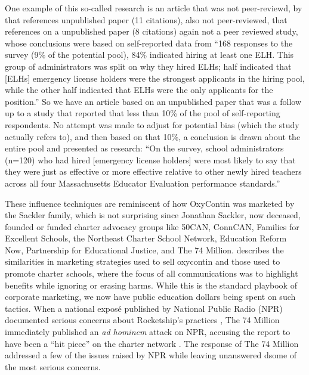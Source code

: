 One example of this so-called research is an article that was not peer-reviewd,  by \citeauthor{Piper-Vallillo2023} that references unpublished paper \textcite{Bacher-Hicks.etal2023} (11 citations), also not peer-reviewed, that references  on a unpublished paper \textcite{Bacher-Hicks.etal2023a} (8 citations) again not a peer reviewed study, whose conclusions were based on self-reported data from ``168 responses to the survey (9\% of the potential pool), 84\% indicated hiring at least one ELH. This group of administrators was split on why they hired ELHs; half indicated that [ELHs] emergency license holders were the strongest applicants in the hiring pool, while the other half indicated that ELHs were the only applicants for the position.'' \parencite[3]{Bacher-Hicks.etal2023} So we have an article based on an unpublished paper that was a follow up to a study that reported that less than 10\% of the pool of self-reporting respondents. No attempt was made to adjust for potential bias (which the study actually refers to), and then based on that 10\%, a conclusion is drawn about the entire pool and presented as research: ``On the survey, school administrators (n=120) who had hired [emergency license holders] were most likely to say that they were just as effective or more effective relative to other newly hired teachers across all four Massachusetts Educator Evaluation performance standards.'' \parencite[3]{Bacher-Hicks.etal2023}

These influence techniques are reminiscent of how OxyContin was marketed by the Sackler family, which is not surprising since Jonathan Sackler, now deceased, founded or funded charter advocacy groups like 50CAN, ConnCAN, Families for Excellent Schools, the Northeast Charter School Network, Education Reform Now, Partnership for Educational Justice, and The 74 Million. \textcite{Dubb2017} describes the similarities in marketing strategies used to sell oxycontin and those used to promote charter schools, where the focus of all communications was to highlight benefits while ignoring or erasing harms. While this is the standard playbook of corporate marketing, we now have public education dollars being spent on such tactics. When a national exposé published by National Public Radio (NPR) documented serious concerns about Rocketship's practices \parencite{Kamenetz2016}, The 74 Million immediately published an \textit{ad hominem} attack on NPR, accusing the report to have been a ``hit piece'' on the charter network \parencite{Smith2016a}. The response of The 74 Million addressed a few of the issues raised by NPR 
while leaving unanswered dsome of the most serious concerns.

